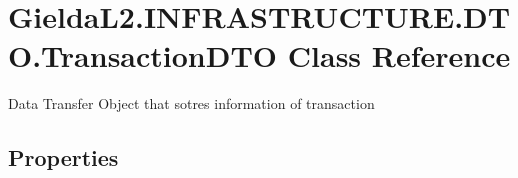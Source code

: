 \hypertarget{class_gielda_l2_1_1_i_n_f_r_a_s_t_r_u_c_t_u_r_e_1_1_d_t_o_1_1_transaction_d_t_o}{}\section{Gielda\+L2.\+I\+N\+F\+R\+A\+S\+T\+R\+U\+C\+T\+U\+R\+E.\+D\+T\+O.\+Transaction\+D\+TO Class Reference}
\label{class_gielda_l2_1_1_i_n_f_r_a_s_t_r_u_c_t_u_r_e_1_1_d_t_o_1_1_transaction_d_t_o}


Data Transfer Object that sotres information of transaction  


\subsection*{Properties}
